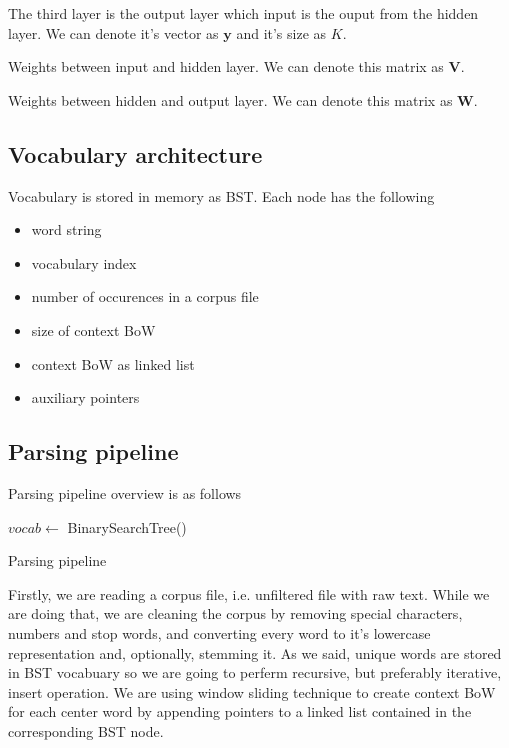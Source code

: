 \documentclass{article}
\newcommand{\SetAlgoStyle}{
	\SetAlgoNoLine
	\SetAlgoNoEnd
	\DontPrintSemicolon
}
\begin{document}
\medbreak

The third layer is the output layer which input is the ouput from the hidden
layer.
We can denote it's vector as $\boldsymbol{y}$ and it's size as $K$.

\medbreak

Weights between input and hidden layer. We can denote this matrix as $\boldsymbol{V}$.

\medbreak

Weights between hidden and output layer. We can denote this matrix as $\boldsymbol{W}$.

\subsection{Vocabulary architecture}

Vocabulary is stored in memory as BST. Each node has the following

\begin{itemize}
	\item word string
	\item vocabulary index
	\item number of occurences in a corpus file
	\item size of context BoW
	\item context BoW as linked list
	\item auxiliary pointers
\end{itemize}

\subsection{Parsing pipeline}

Parsing pipeline overview is as follows

\begin{algorithm}[H]
	\SetAlgoStyle
	$vocab \gets$ BinarySearchTree()\;
	\caption{Parsing pipeline}
\end{algorithm}

Firstly, we are reading a corpus file, i.e. unfiltered file with raw
text. While we are doing that, we are cleaning the corpus by removing special
characters, numbers and stop words, and converting every word to it's
lowercase representation and, optionally, stemming it. As we said, unique words are stored in BST
vocabuary so we are going to perferm recursive, but preferably iterative,
insert operation. We are using window sliding technique to create context BoW 
for each center word by appending pointers to a linked list contained in the
corresponding BST node.
\end{document}
